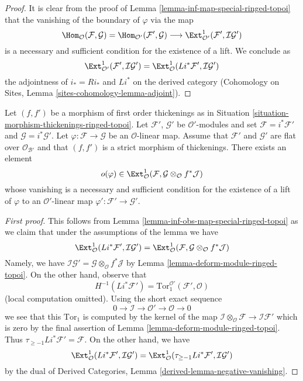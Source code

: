 \begin{proof}
It is clear from the proof of Lemma \ref{lemma-inf-map-special-ringed-topoi}
that the vanishing of the boundary of $\varphi$ via the map
$$
\Hom_\mathcal{O}(\mathcal{F}, \mathcal{G}) =
\Hom_{\mathcal{O}'}(\mathcal{F}', \mathcal{G}) \longrightarrow
\Ext^1_{\mathcal{O}'}(\mathcal{F}', \mathcal{I}\mathcal{G}')
$$
is a necessary and sufficient condition for the existence of a lift. We
conclude as
$$
\Ext^1_{\mathcal{O}'}(\mathcal{F}', \mathcal{I}\mathcal{G}') =
\Ext^1_\mathcal{O}(Li^*\mathcal{F}', \mathcal{I}\mathcal{G}')
$$
the adjointness of $i_* = Ri_*$ and $Li^*$ on the derived category
(Cohomology on Sites, Lemma \ref{sites-cohomology-lemma-adjoint}).
\end{proof}

\begin{lemma}
\label{lemma-inf-obs-map-rel-ringed-topoi}
Let $(f, f')$ be a morphism of first order thickenings as in
Situation \ref{situation-morphism-thickenings-ringed-topoi}.
Let $\mathcal{F}'$, $\mathcal{G}'$ be $\mathcal{O}'$-modules and set
$\mathcal{F} = i^*\mathcal{F}'$ and $\mathcal{G} = i^*\mathcal{G}'$.
Let $\varphi : \mathcal{F} \to \mathcal{G}$ be an $\mathcal{O}$-linear map.
Assume that $\mathcal{F}'$ and $\mathcal{G}'$ are flat over
$\mathcal{O}_{\mathcal{B}'}$ and
that $(f, f')$ is a strict morphism of thickenings. There exists an element
$$
o(\varphi) \in
\Ext^1_\mathcal{O}(\mathcal{F},
\mathcal{G} \otimes_\mathcal{O} f^*\mathcal{J})
$$
whose vanishing is a necessary and sufficient condition for the
existence of a lift of $\varphi$ to an $\mathcal{O}'$-linear map
$\varphi' : \mathcal{F}' \to \mathcal{G}'$.
\end{lemma}

\begin{proof}[First proof]
This follows from Lemma \ref{lemma-inf-obs-map-special-ringed-topoi}
as we claim that under the assumptions of the lemma we have
$$
\Ext^1_\mathcal{O}(Li^*\mathcal{F}', \mathcal{I}\mathcal{G}') =
\Ext^1_\mathcal{O}(\mathcal{F},
\mathcal{G} \otimes_\mathcal{O} f^*\mathcal{J})
$$
Namely, we have
$\mathcal{I}\mathcal{G}' =
\mathcal{G} \otimes_\mathcal{O} f^*\mathcal{J}$
by Lemma \ref{lemma-deform-module-ringed-topoi}.
On the other hand, observe that
$$
H^{-1}(Li^*\mathcal{F}') =
\text{Tor}_1^{\mathcal{O}'}(\mathcal{F}', \mathcal{O})
$$
(local computation omitted). Using the short exact sequence
$$
0 \to \mathcal{I} \to \mathcal{O}' \to \mathcal{O} \to 0
$$
we see that this $\text{Tor}_1$ is computed by the kernel of the map
$\mathcal{I} \otimes_\mathcal{O} \mathcal{F} \to \mathcal{I}\mathcal{F}'$
which is zero by the final assertion of
Lemma \ref{lemma-deform-module-ringed-topoi}.
Thus $\tau_{\geq -1}Li^*\mathcal{F}' = \mathcal{F}$.
On the other hand, we have
$$
\Ext^1_\mathcal{O}(Li^*\mathcal{F}',
\mathcal{I}\mathcal{G}') =
\Ext^1_\mathcal{O}(\tau_{\geq -1}Li^*\mathcal{F}',
\mathcal{I}\mathcal{G}')
$$
by the dual of
Derived Categories, Lemma \ref{derived-lemma-negative-vanishing}.
\end{proof}


